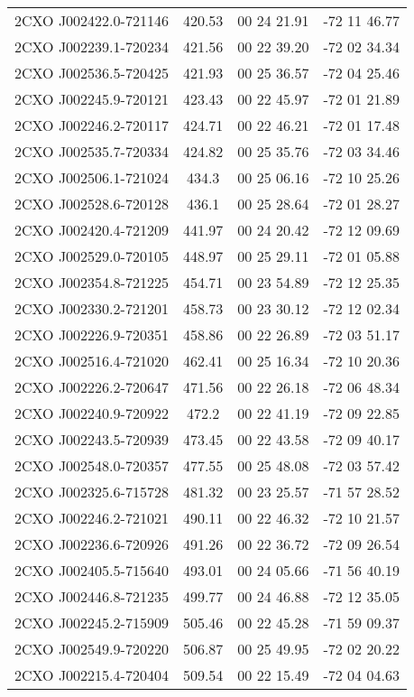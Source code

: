 \begin{table}
\begin{tabular}{cccc}
2CXO J002422.0-721146 & 420.53 & 00 24 21.91 & -72 11 46.77 \\
2CXO J002239.1-720234 & 421.56 & 00 22 39.20 & -72 02 34.34 \\
2CXO J002536.5-720425 & 421.93 & 00 25 36.57 & -72 04 25.46 \\
2CXO J002245.9-720121 & 423.43 & 00 22 45.97 & -72 01 21.89 \\
2CXO J002246.2-720117 & 424.71 & 00 22 46.21 & -72 01 17.48 \\
2CXO J002535.7-720334 & 424.82 & 00 25 35.76 & -72 03 34.46 \\
2CXO J002506.1-721024 & 434.3 & 00 25 06.16 & -72 10 25.26 \\
2CXO J002528.6-720128 & 436.1 & 00 25 28.64 & -72 01 28.27 \\
2CXO J002420.4-721209 & 441.97 & 00 24 20.42 & -72 12 09.69 \\
2CXO J002529.0-720105 & 448.97 & 00 25 29.11 & -72 01 05.88 \\
2CXO J002354.8-721225 & 454.71 & 00 23 54.89 & -72 12 25.35 \\
2CXO J002330.2-721201 & 458.73 & 00 23 30.12 & -72 12 02.34 \\
2CXO J002226.9-720351 & 458.86 & 00 22 26.89 & -72 03 51.17 \\
2CXO J002516.4-721020 & 462.41 & 00 25 16.34 & -72 10 20.36 \\
2CXO J002226.2-720647 & 471.56 & 00 22 26.18 & -72 06 48.34 \\
2CXO J002240.9-720922 & 472.2 & 00 22 41.19 & -72 09 22.85 \\
2CXO J002243.5-720939 & 473.45 & 00 22 43.58 & -72 09 40.17 \\
2CXO J002548.0-720357 & 477.55 & 00 25 48.08 & -72 03 57.42 \\
2CXO J002325.6-715728 & 481.32 & 00 23 25.57 & -71 57 28.52 \\
2CXO J002246.2-721021 & 490.11 & 00 22 46.32 & -72 10 21.57 \\
2CXO J002236.6-720926 & 491.26 & 00 22 36.72 & -72 09 26.54 \\
2CXO J002405.5-715640 & 493.01 & 00 24 05.66 & -71 56 40.19 \\
2CXO J002446.8-721235 & 499.77 & 00 24 46.88 & -72 12 35.05 \\
2CXO J002245.2-715909 & 505.46 & 00 22 45.28 & -71 59 09.37 \\
2CXO J002549.9-720220 & 506.87 & 00 25 49.95 & -72 02 20.22 \\
2CXO J002215.4-720404 & 509.54 & 00 22 15.49 & -72 04 04.63 \\

\end{tabular}
\end{table}
